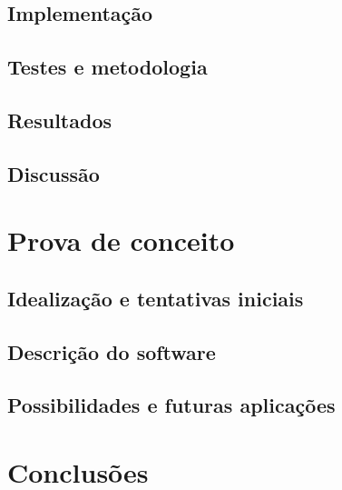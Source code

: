 \documentclass[12pt]{article}
\begin{document}
		\subsection{Implementação}
		
		\subsection{Testes e metodologia}
		
		\subsection{Resultados}
		
		\subsection{Discussão}
		
	\section{Prova de conceito}
	
		\subsection{Idealização e tentativas iniciais}
		
		\subsection{Descrição do software}
		
		\subsection{Possibilidades e futuras aplicações}
		
	\section{Conclusões}
	
\end{document}
